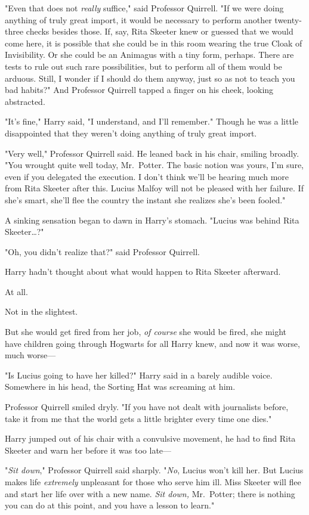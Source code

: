 "Even that does not \emph{really} suffice," said Professor Quirrell. "If we
were doing anything of truly great import, it would be necessary to perform
another twenty-three checks besides those. If, say, Rita Skeeter knew or
guessed that we would come here, it is possible that she could be in this room
wearing the true Cloak of Invisibility. Or she could be an Animagus with a tiny
form, perhaps. There are tests to rule out such rare possibilities, but to
perform all of them would be arduous. Still, I wonder if I should do them
anyway, just so as not to teach you bad habits?" And Professor Quirrell tapped
a finger on his cheek, looking abstracted.

"It's fine," Harry said, "I understand, and I'll remember." Though he was a
little disappointed that they weren't doing anything of truly great import.

"Very well," Professor Quirrell said. He leaned back in his chair, smiling
broadly. "You wrought quite well today, Mr.~Potter. The basic notion was yours,
I'm sure, even if you delegated the execution. I don't think we'll be hearing
much more from Rita Skeeter after this. Lucius Malfoy will not be pleased with
her failure. If she's smart, she'll flee the country the instant she realizes
she's been fooled."

A sinking sensation began to dawn in Harry's stomach. "Lucius was behind Rita
Skeeter{\ldots}?"

"Oh, you didn't realize that?" said Professor Quirrell.

Harry hadn't thought about what would happen to Rita Skeeter afterward.

At all.

Not in the slightest.

But she would get fired from her job, \emph{of course} she would be fired, she
might have children going through Hogwarts for all Harry knew, and now it was
worse, much worse---

"Is Lucius going to have her killed?" Harry said in a barely audible voice.
Somewhere in his head, the Sorting Hat was screaming at him.

Professor Quirrell smiled dryly. "If you have not dealt with journalists
before, take it from me that the world gets a little brighter every time one
dies."

Harry jumped out of his chair with a convulsive movement, he had to find Rita
Skeeter and warn her before it was too late---

"\emph{Sit down}," Professor Quirrell said sharply. "\emph{No}, Lucius won't
kill her. But Lucius makes life \emph{extremely} unpleasant for those who serve
him ill. Miss Skeeter will flee and start her life over with a new name.
\emph{Sit down,} Mr.~Potter; there is nothing you can do at this point, and you
have a lesson to learn."

